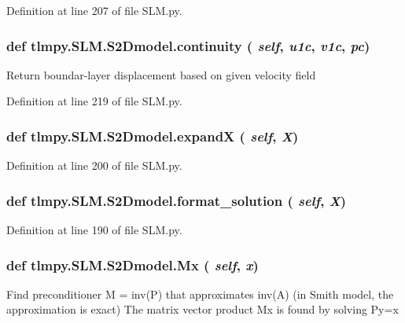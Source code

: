 Definition at line 207 of file SLM.py.\hypertarget{classtlmpy_1_1SLM_1_1S2Dmodel_a7423306e1f8d12c14cb6952faf500c22}{
\subsubsection[{continuity}]{\setlength{\rightskip}{0pt plus 5cm}def tlmpy.SLM.S2Dmodel.continuity ( {\em self}, \/   {\em u1c}, \/   {\em v1c}, \/   {\em pc})}}
\label{classtlmpy_1_1SLM_1_1S2Dmodel_a7423306e1f8d12c14cb6952faf500c22}
\begin{DoxyVerb}Return boundar-layer displacement based on given velocity field\end{DoxyVerb}
 

Definition at line 219 of file SLM.py.\hypertarget{classtlmpy_1_1SLM_1_1S2Dmodel_a8604356a206fb4ff5edffbfb9d24f219}{
\subsubsection[{expandX}]{\setlength{\rightskip}{0pt plus 5cm}def tlmpy.SLM.S2Dmodel.expandX ( {\em self}, \/   {\em X})}}
\label{classtlmpy_1_1SLM_1_1S2Dmodel_a8604356a206fb4ff5edffbfb9d24f219}


Definition at line 200 of file SLM.py.\hypertarget{classtlmpy_1_1SLM_1_1S2Dmodel_ae39050157bf51190ac3f6ad7fcca3235}{
\subsubsection[{format\_\-solution}]{\setlength{\rightskip}{0pt plus 5cm}def tlmpy.SLM.S2Dmodel.format\_\-solution ( {\em self}, \/   {\em X})}}
\label{classtlmpy_1_1SLM_1_1S2Dmodel_ae39050157bf51190ac3f6ad7fcca3235}


Definition at line 190 of file SLM.py.\hypertarget{classtlmpy_1_1SLM_1_1S2Dmodel_aeb6b1db41db9879bf5ce6c6f54f3fe6a}{
\subsubsection[{Mx}]{\setlength{\rightskip}{0pt plus 5cm}def tlmpy.SLM.S2Dmodel.Mx ( {\em self}, \/   {\em x})}}
\label{classtlmpy_1_1SLM_1_1S2Dmodel_aeb6b1db41db9879bf5ce6c6f54f3fe6a}
\begin{DoxyVerb}
Find preconditioner M = inv(P) that approximates inv(A)
(in Smith model, the approximation is exact)
The matrix vector product Mx is found by solving Py=x
\end{DoxyVerb}
 

